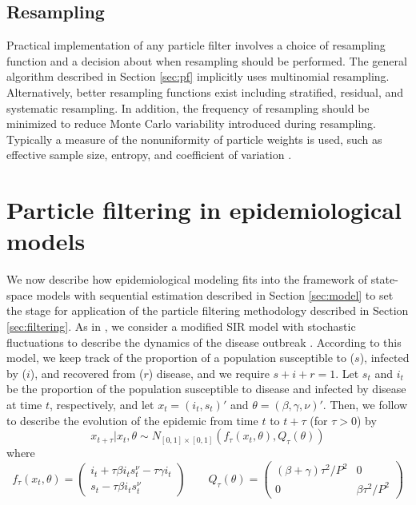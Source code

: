 \documentclass[useAMS,referee,usenatbib]{biom}
\begin{document}
\subsection{Resampling}

Practical implementation of any particle filter involves a choice of resampling function and a decision about when resampling should be performed. The general algorithm described in Section \ref{sec:pf} implicitly uses multinomial resampling. Alternatively, better resampling functions exist including stratified, residual, and systematic resampling. In addition, the frequency of resampling should be minimized to reduce Monte Carlo variability introduced during resampling. Typically a measure of the nonuniformity of particle weights is used, such as effective sample size, entropy, and coefficient of variation \citep{Douc:Capp:Moul:comp:2005}.

\section{Particle filtering in epidemiological models \label{sec:apply}}

We now describe how epidemiological modeling fits into the framework of state-space models with sequential estimation described in Section \ref{sec:model} to set the stage for application of the particle filtering methodology described in Section \ref{sec:filtering}. As in \citet{skvortsov2012monitoring}, we consider a modified SIR model with stochastic fluctuations to describe the dynamics of the disease outbreak \citep{herwaarden1995stochepid, dangerfield2009stochepid, anderson2004sars}.  According to this model, we keep track of the proportion of a population susceptible to ($s$), infected by ($i$), and recovered from ($r$) disease, and we require $s + i + r = 1$.  Let $s_t$ and $i_t$ be the proportion of the population susceptible to disease and infected by disease at time $t$, respectively, and let $x_t = (i_t,s_t)'$ and $\theta = (\beta,\gamma,\nu)'$.  Then, we follow \citet{skvortsov2012monitoring} to describe the evolution of the epidemic from time $t$ to $t + \tau$ (for $\tau > 0$) by
\begin{equation}
x_{t+\tau}\left|x_t,\theta\right. \sim N_{[0,1]\times[0,1]}\left(f_\tau(x_t,\theta),Q_{\tau}(\theta)\right) \label{eqn:state}
\end{equation}
\noindent where
\[
f_\tau(x_t,\theta) = \left(
\begin{array}{c}
i_t +  \tau\beta i_ts^\nu_t - \tau\gamma i_t \\
s_t - \tau\beta i_ts^{\nu}_t
\end{array}
\right)
\qquad
Q_\tau(\theta) = \left(
\begin{array}{ccccc}
(\beta + \gamma)\tau^2/P^2 & 0 \\
0 & \beta\tau^2/P^2
\end{array}
\right)
\]
\end{document}
